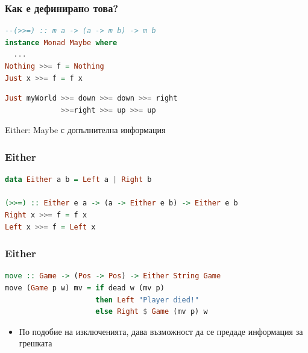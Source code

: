 \documentclass{beamer}
\begin{document}
\begin{frame}[fragile]
  \frametitle{Как е дефиниранo това?}

\begin{lstlisting}[language=Haskell]
--(>>=) :: m a -> (a -> m b) -> m b
instance Monad Maybe where
  ...
Nothing >>= f = Nothing
Just x >>= f = f x
\end{lstlisting}


\begin{lstlisting}[language=Haskell]
Just myWorld >>= down >>= down >>= right 
             >>=right >>= up >>= up
\end{lstlisting}

\end{frame}

\begin{frame}
  \centerline{Either: Maybe с допълнителна информация}
\end{frame}

\begin{frame}[fragile]
  \frametitle{Either}

\begin{lstlisting}[language=Haskell]
data Either a b = Left a | Right b

(>>=) :: Either e a -> (a -> Either e b) -> Either e b 
Right x >>= f = f x
Left x >>= f = Left x
\end{lstlisting}

\end{frame}


\begin{frame}[fragile]
  \frametitle{Either}

\begin{lstlisting}[language=Haskell]
move :: Game -> (Pos -> Pos) -> Either String Game
move (Game p w) mv = if dead w (mv p) 
                     then Left "Player died!" 
                     else Right $ Game (mv p) w
\end{lstlisting}

\begin{itemize}
  \item По подобие на изключенията, дава възможност да се предаде информация за грешката
\end{itemize}

\end{frame}
\end{document}
